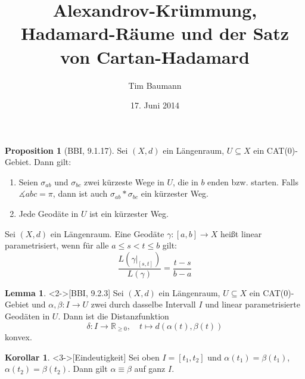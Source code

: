 \documentclass{beamer}
\title{Alexandrov-Krümmung, Hadamard-Räume und der Satz von Cartan-Hadamard}
\author{Tim Baumann}
\institute{Seminar Metrische Geometrie}
\date{17. Juni 2014}
\newcommand{\R}{\mathbb{R}} %
\renewcommand{\emph}[1]{\textcolor{Emph}{#1}}
\theoremstyle{definition}
\newtheorem*{lem}{Lemma}
\newtheorem*{kor}{Korollar}
\newtheorem*{prop}{Proposition}
\begin{document}
\setlength{\abovedisplayskip}{2pt}
\setlength{\belowdisplayskip}{2pt}
\setlength{\abovedisplayshortskip}{2pt}
\setlength{\belowdisplayshortskip}{2pt}

\begin{frame}[plain]
  \titlepage
\end{frame}

\iffalse
\begin{frame}
  \begin{prop}[BBI, 9.1.17]
    Sei $(X, d)$ ein Längenraum, $U \subseteq X$ ein CAT($0$)-Gebiet. Dann gilt:
    \begin{enumerate}
      \item Seien $\sigma_{ab}$ und $\sigma_{bc}$ zwei kürzeste Wege in $U$, die in $b$ enden bzw. starten. Falls $\measuredangle abc = \pi$, dann ist auch $\sigma_{ab} * \sigma_{bc}$ ein kürzester Weg.
      \item Jede Geodäte in $U$ ist ein kürzester Weg.
    \end{enumerate}
  \end{prop}
\end{frame}

\begin{frame}
  \begin{definition}
    Sei $(X, d)$ ein Längenraum. Eine Geodäte $\gamma : \left[a, b\right] \to X$ heißt \emph{linear parametrisiert}, wenn für alle $a \leq s < t \leq b$ gilt:
    \[ \frac{L(\gamma|_{\left[s,t\right]})}{L(\gamma)} = \frac{t-s}{b-a} \]
  \end{definition}

  \begin{lem}<2->[BBI, 9.2.3]
    Sei $(X, d)$ ein Längenraum, $U \subseteq X$ ein CAT($0$)-Gebiet und $\alpha, \beta : I \to U$ zwei durch dasselbe Intervall $I$ und linear parametrisierte Geodäten in $U$. Dann ist die Distanzfunktion
    \[ \delta : I \to \R_{\geq 0}, \quad t \mapsto d(\alpha(t), \beta(t)) \]
    konvex.
  \end{lem}

  \begin{kor}<3->[Eindeutigkeit]
    Sei oben $I = \left[t_1, t_2\right]$ und $\alpha(t_1) = \beta(t_1)$, $\alpha(t_2) = \beta(t_2)$. Dann gilt $\alpha \equiv \beta$ auf ganz $I$.
  \end{kor}
\end{frame}
\end{document}
